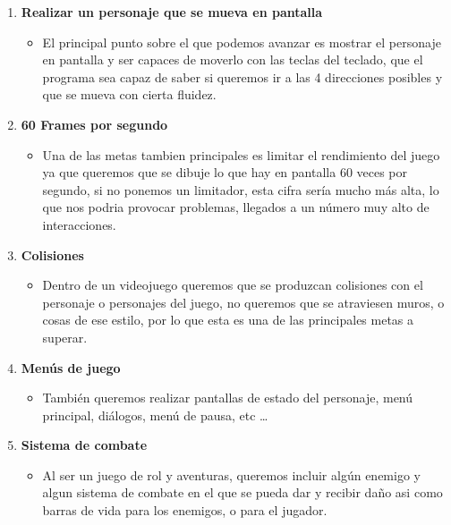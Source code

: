 \documentclass[a4paper]{article}
\begin{document}
\begin{enumerate}
    \item \textbf{Realizar un personaje que se mueva en pantalla}
          \begin{itemize}
              \item El principal punto sobre el que podemos avanzar es mostrar el personaje en pantalla y ser capaces de moverlo con las teclas del teclado, que el programa sea capaz de saber si queremos ir a las 4 direcciones posibles y que se mueva con cierta fluidez.
          \end{itemize}

    \item \textbf{60 Frames por segundo}
          \begin{itemize}
              \item Una de las metas tambien principales es limitar el rendimiento del juego ya que queremos que se dibuje lo que hay en pantalla 60 veces por segundo, si no ponemos un limitador, esta cifra sería mucho más alta, lo que nos podria provocar problemas, llegados a un número muy alto de interacciones.
          \end{itemize}

    \item \textbf{Colisiones}
          \begin{itemize}
              \item Dentro de un videojuego queremos que se produzcan colisiones con el personaje o personajes del juego, no queremos que se atraviesen muros, o cosas de ese estilo, por lo que esta es una de las principales metas a superar.
          \end{itemize}

    \item \textbf{Menús de juego}
          \begin{itemize}
              \item También queremos realizar pantallas de estado del personaje, menú principal, diálogos, menú de pausa, etc \dots
          \end{itemize}

    \item \textbf{Sistema de combate}
          \begin{itemize}
              \item Al ser un juego de rol y aventuras, queremos incluir algún enemigo y algun sistema de combate en el que se pueda dar y recibir daño asi como barras de vida para los enemigos, o para el jugador.
          \end{itemize}


\end{enumerate}
\end{document}
